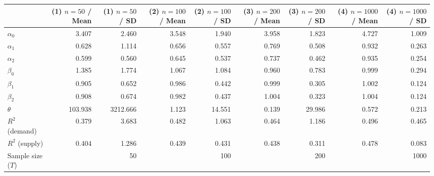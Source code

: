 
\begin{tabular}[t]{lrrrrrrrr}
\toprule
  & (1) $n=50$ / Mean & (1) $n=50$ / SD & (2) $n=100$ / Mean & (2) $n=100$ / SD & (3) $n=200$ / Mean & (3) $n=200$ / SD & (4) $n=1000$ / Mean & (4) $n=1000$ / SD\\
\midrule
$\alpha_{0}$ & 3.407 & 2.460 & 3.548 & 1.940 & 3.958 & 1.823 & 4.727 & 1.009\\
$\alpha_{1}$ & 0.628 & 1.114 & 0.656 & 0.557 & 0.769 & 0.508 & 0.932 & 0.263\\
$\alpha_{2}$ & 0.599 & 0.560 & 0.645 & 0.537 & 0.737 & 0.462 & 0.935 & 0.254\\
$\beta_{0}$ & 1.385 & 1.774 & 1.067 & 1.084 & 0.960 & 0.783 & 0.999 & 0.294\\
$\beta_{1}$ & 0.905 & 0.652 & 0.986 & 0.442 & 0.999 & 0.305 & 1.002 & 0.124\\
$\beta_{2}$ & 0.908 & 0.674 & 0.982 & 0.437 & 1.004 & 0.323 & 1.004 & 0.124\\
$\theta$ & 103.938 & 3212.666 & 1.123 & 14.551 & 0.139 & 29.986 & 0.572 & 0.213\\
$R^{2}$ (demand) & 0.379 & 3.683 & 0.482 & 1.063 & 0.464 & 1.186 & 0.496 & 0.465\\
$R^{2}$ (supply) & 0.404 & 1.286 & 0.439 & 0.431 & 0.438 & 0.311 & 0.478 & 0.083\\
Sample size ($T$) &  & 50 &  & 100 &  & 200 &  & 1000\\
\bottomrule
\end{tabular}
